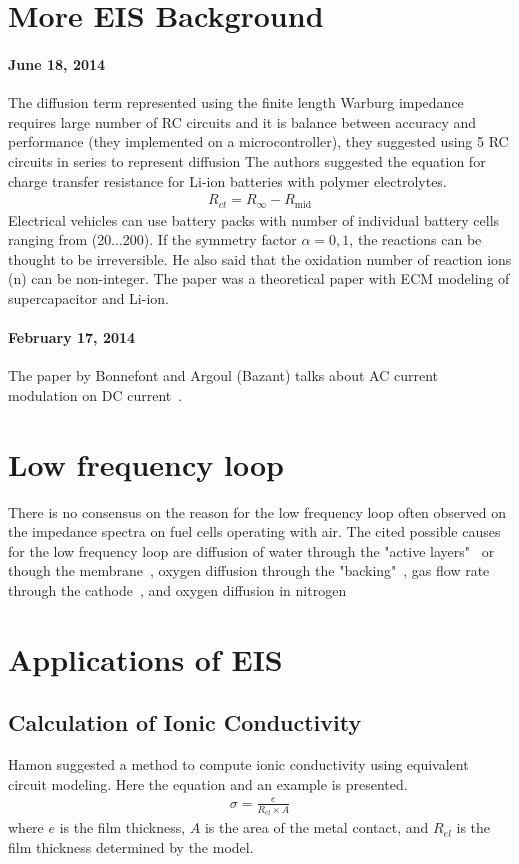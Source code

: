 \documentclass[Notes.tex]{subfiles}
\begin{document}
\section{More EIS Background}
\paragraph*{June 18, 2014}
The diffusion term represented using the finite length Warburg impedance requires large number of RC circuits and it is balance between accuracy and performance (they implemented on a microcontroller), they suggested using 5 RC circuits in series to represent diffusion\cite{Fleischer2014}
The authors suggested the equation for charge transfer resistance for Li-ion batteries with polymer electrolytes.
\begin{align}
R_{ct}=R_\infty-R_{\textrm{mid}}            
\end{align}
Electrical vehicles can use battery packs with number of individual battery cells ranging from (20...200)\cite{Fleischer2014}.
If the symmetry factor $\alpha = 0,1$, the reactions can be thought to be irreversible. He also said that the oxidation number of reaction ions (n) can be non-integer. The paper was a theoretical paper with ECM modeling of supercapacitor and Li-ion\cite{Buller2005}.
\paragraph*{February 17, 2014}
The paper by Bonnefont and Argoul (Bazant) talks about AC current modulation on DC current~\cite{Bonnefont2000}. 

\section{Low frequency loop}
There is no consensus on the reason for the low frequency loop often observed on the impedance spectra on fuel cells operating with air.
The cited possible causes for the low frequency loop are diffusion of water through the "active layers"~\cite{Freire2001,Wagner1998} or though the membrane~\cite{Paganin1998}, oxygen diffusion through the "backing"~\cite{Springer1996}, gas flow rate through the cathode~\cite{Ciureanu2001}, and oxygen diffusion in nitrogen~\cite{Boillot2006}

\section{Applications of EIS}
\subsection{Calculation of Ionic Conductivity}
Hamon suggested a method to compute ionic conductivity using equivalent circuit modeling. Here the equation and an example is presented.
\begin{align}
\sigma= \frac{e}{R_{el}\times A}
\end{align}
where $e$ is the film thickness, $A$ is the area of the metal contact, and $R_{el}$ is the film thickness determined by the model.
\end{document}
